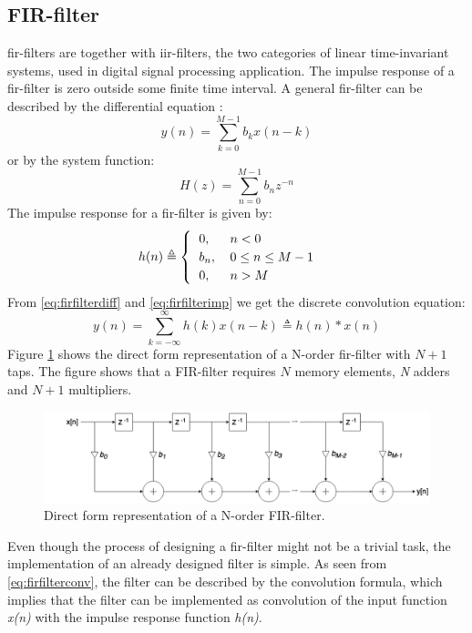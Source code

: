 \subsection{\label{subsec:refdesfir}FIR-filter}
\gls{fir}-filters are together with \gls{iir}-filters, the two categories of linear time-invariant systems, used in digital signal processing application. The impulse response of a \gls{fir}-filter is zero outside some finite time interval. 
A general \gls{fir}-filter can be described by the differential equation \cite{proakis2007digital}:
\begin{equation}
    y(n)=\sum\limits_{k=0}^{M-1} b_kx(n-k)
    \label{eq:firfilterdiff}
\end{equation}
or by the system function:
\begin{equation}
    H(z)=\sum\limits_{n=0}^{M-1} b_nz^{-n}
    \label{eq:firfiltersys}
\end{equation}
The impulse response for a \gls{fir}-filter is given by:
\begin{equation}
    h(n)\triangleq
    \begin{cases}
    \begin{tabular}{ll}
      $0,$ & $n < 0$  \\
      $b_n,$ & $0 \leq n \leq M-1$  \\
      $0,$ & $n > M$   
      \end{tabular}
    \end{cases}
    \label{eq:firfilterimp}
\end{equation}
From \cref{eq:firfilterdiff} and \cref{eq:firfilterimp} we get the discrete convolution equation:
\begin{equation}
    y(n)=\sum\limits_{k=-\infty}^{\infty} h(k)x(n-k) \triangleq h(n) \ast x(n)
    \label{eq:firfilterconv}
\end{equation}
\noindent
Figure \ref{fig:firfilter} shows the direct form representation of a N-order \gls{fir}-filter with $N+1$ taps. The figure shows that a FIR-filter requires $N$ memory elements, \textit{N} adders and $N+1$ multipliers. 
\begin{figure}[hbpt]
\centering
\includegraphics[width=\textwidth]{../figs/FIRFilter.png}
\caption{\label{fig:firfilter}Direct form representation of a N-order FIR-filter.}
\end{figure}


Even though the process of designing a \gls{fir}-filter might not be a trivial task, the implementation of an already designed filter is simple. As seen from \cref{eq:firfilterconv}, the filter can be described by the convolution formula, which implies that the filter can be implemented as convolution of the input function \textit{x(n)} with the impulse response function \textit{h(n)}.